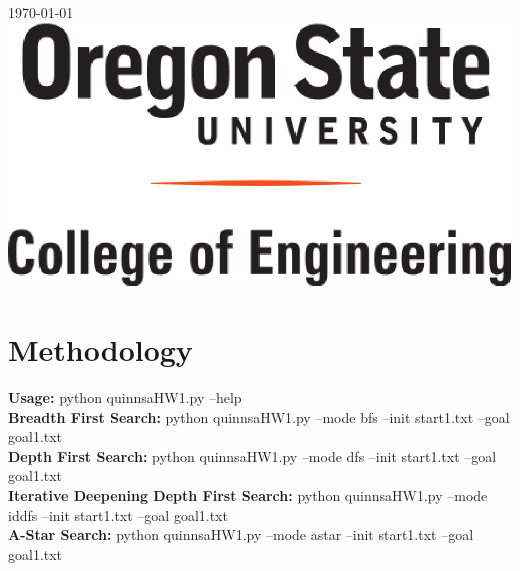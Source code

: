 \documentclass[letterpaper,11pt,notitlepage,fleqn]{article}
\begin{document}
\begin{titlepage}

{\large \today}\\[3cm] %


    \includegraphics[scale=0.5]{coe.eps}\\[1cm] %


\vfill %



\end{titlepage}

\tableofcontents
\newpage

\section{Methodology}
\noindent \textbf{Usage:} python quinnsaHW1.py --help\\
\textbf{Breadth First Search:} python quinnsaHW1.py --mode bfs --init start1.txt --goal goal1.txt\\
\textbf{Depth First Search:} python quinnsaHW1.py --mode dfs --init start1.txt --goal goal1.txt\\
\textbf{Iterative Deepening Depth First Search:} python quinnsaHW1.py --mode iddfs --init start1.txt --goal goal1.txt\\
\textbf{A-Star Search:} python quinnsaHW1.py --mode astar --init start1.txt --goal goal1.txt\\
\end{document}
